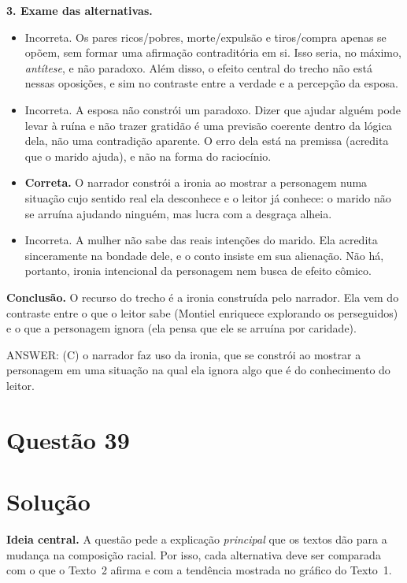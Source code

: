 \documentclass{article}%
\begin{document}
\textbf{3. Exame das alternativas.}
\begin{itemize}
\item[(a)] Incorreta. Os pares ricos/pobres, morte/expulsão e tiros/compra apenas se opõem, sem formar uma afirmação contraditória em si. Isso seria, no máximo, \emph{antítese}, e não paradoxo. Além disso, o efeito central do trecho não está nessas oposições, e sim no contraste entre a verdade e a percepção da esposa.
\item[(b)] Incorreta. A esposa não constrói um paradoxo. Dizer que ajudar alguém pode levar à ruína e não trazer gratidão é uma previsão coerente dentro da lógica dela, não uma contradição aparente. O erro dela está na premissa (acredita que o marido ajuda), e não na forma do raciocínio.
\item[(c)] \textbf{Correta.} O narrador constrói a ironia ao mostrar a personagem numa situação cujo sentido real ela desconhece e o leitor já conhece: o marido não se arruína ajudando ninguém, mas lucra com a desgraça alheia.
\item[(d)] Incorreta. A mulher não sabe das reais intenções do marido. Ela acredita sinceramente na bondade dele, e o conto insiste em sua alienação. Não há, portanto, ironia intencional da personagem nem busca de efeito cômico.
\end{itemize}

\textbf{Conclusão.} O recurso do trecho é a ironia construída pelo narrador. Ela vem do contraste entre o que o leitor sabe (Montiel enriquece explorando os perseguidos) e o que a personagem ignora (ela pensa que ele se arruína por caridade).

ANSWER: (C) o narrador faz uso da ironia, que se constrói ao mostrar a personagem em uma situação na qual ela ignora algo que é do conhecimento do leitor.%
\newpage%
\section*{Questão 39}

\section*{Solução}

\textbf{Ideia central.} A questão pede a explicação \emph{principal} que os textos dão para a mudança na composição racial. Por isso, cada alternativa deve ser comparada com o que o Texto~2 afirma e com a tendência mostrada no gráfico do Texto~1.
\end{document}
